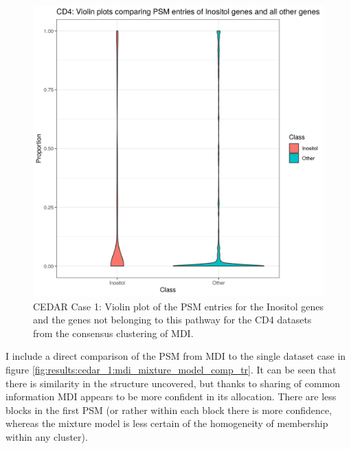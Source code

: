 \documentclass[12pt]{article} %
\begin{document}
\begin{figure}[h]
	\centering
	\includegraphics[scale=0.75]{Images/Biology_data/Set_250/All_datasets/PSM_densities/KEGG_INOSITOL_PHOSPHATE_METABOLISM/CD4.png}
	\caption{CEDAR Case 1: Violin plot of the PSM entries for the Inositol genes and the genes not belonging to this pathway for the CD4 datasets from the consensus clustering of MDI.}
	\label{fig:results:cedar_1:mdi_cd4_inostiol_psm_violin}
\end{figure}
	
	I include a direct comparison of the PSM from MDI to the single dataset case in figure \ref{fig:results:cedar_1:mdi_mixture_model_comp_tr}. It can be seen that there is similarity in the structure uncovered, but thanks to sharing of common information MDI appears to be more confident in its allocation. There are less blocks in the first PSM (or rather within each block there is more confidence, whereas the mixture model is less certain of the homogeneity of membership within any cluster).
	
	
\end{document}
